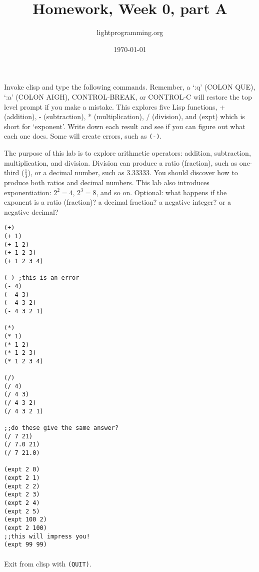 \documentclass{article}
\title{Homework, Week 0, part A}
\author{lightprogramming.org}
\date{\today}
\begin{document}
\maketitle{}
\lstset{language=Lisp}

Invoke clisp and type the following commands. Remember, a `:q' (COLON QUE), `:a' (COLON AIGH), CONTROL-BREAK, or CONTROL-C will restore the top level prompt if you make a mistake. This explores five Lisp functions, + (addition), - (subtraction), * (multiplication), / (division), and (expt) which is short for `exponent'. Write down each result and see if you can figure out what each one does. Some will create errors, such as \texttt{(-)}.

The purpose of this lab is to explore arithmetic operators: addition, subtraction, multiplication, and division. Division can produce a ratio (fraction), such as one-third ($\frac{1}{3}$), or a decimal number, such as 3.33333. You should discover how to produce both ratios and decimal numbers. This lab also introduces exponentiation: $2^2 = 4$, $2^3 = 8$, and so on. Optional: what happens if the exponent is a ratio (fraction)? a decimal fraction? a negative integer? or a negative decimal?
\begin{multicols}{2}
\begin{lstlisting}
(+)
(+ 1)
(+ 1 2)
(+ 1 2 3)
(+ 1 2 3 4)

(-) ;this is an error
(- 4)
(- 4 3)
(- 4 3 2)
(- 4 3 2 1)

(*)
(* 1)
(* 1 2)
(* 1 2 3)
(* 1 2 3 4)

(/)
(/ 4)
(/ 4 3)
(/ 4 3 2)
(/ 4 3 2 1)

;;do these give the same answer?
(/ 7 21)
(/ 7.0 21)
(/ 7 21.0)

(expt 2 0)
(expt 2 1)
(expt 2 2)
(expt 2 3)
(expt 2 4)
(expt 2 5)
(expt 100 2)
(expt 2 100)
;;this will impress you!
(expt 99 99)
\end{lstlisting}
\end{multicols}

\paragraph{}Exit from clisp with \texttt{(QUIT)}.
\end{document}
